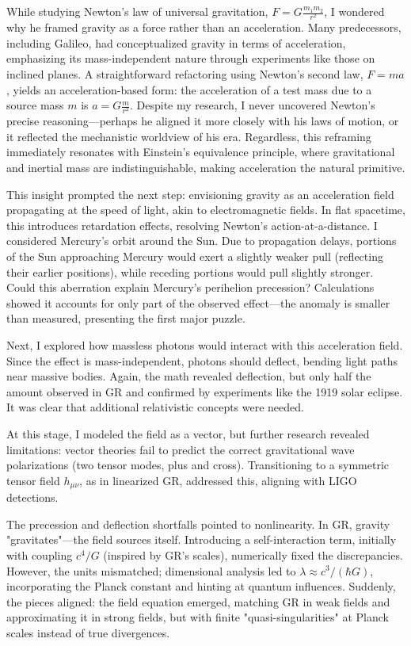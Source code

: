 \documentclass{article}
\begin{document}
While studying Newton's law of universal gravitation, \( F = G \frac{m_1 m_2}{r^2} \), I wondered why he framed gravity as a force rather than an acceleration. Many predecessors, including Galileo, had conceptualized gravity in terms of acceleration, emphasizing its mass-independent nature through experiments like those on inclined planes. A straightforward refactoring using Newton's second law, \( F = m a \), yields an acceleration-based form: the acceleration of a test mass due to a source mass \( m \) is \( a = G \frac{m}{r^2} \). Despite my research, I never uncovered Newton's precise reasoning—perhaps he aligned it more closely with his laws of motion, or it reflected the mechanistic worldview of his era. Regardless, this reframing immediately resonates with Einstein's equivalence principle, where gravitational and inertial mass are indistinguishable, making acceleration the natural primitive.

This insight prompted the next step: envisioning gravity as an acceleration field propagating at the speed of light, akin to electromagnetic fields. In flat spacetime, this introduces retardation effects, resolving Newton's action-at-a-distance. I considered Mercury's orbit around the Sun. Due to propagation delays, portions of the Sun approaching Mercury would exert a slightly weaker pull (reflecting their earlier positions), while receding portions would pull slightly stronger. Could this aberration explain Mercury's perihelion precession? Calculations showed it accounts for only part of the observed effect—the anomaly is smaller than measured, presenting the first major puzzle.

Next, I explored how massless photons would interact with this acceleration field. Since the effect is mass-independent, photons should deflect, bending light paths near massive bodies. Again, the math revealed deflection, but only half the amount observed in GR and confirmed by experiments like the 1919 solar eclipse. It was clear that additional relativistic concepts were needed.

At this stage, I modeled the field as a vector, but further research revealed limitations: vector theories fail to predict the correct gravitational wave polarizations (two tensor modes, plus and cross). Transitioning to a symmetric tensor field \( h_{\mu\nu} \), as in linearized GR, addressed this, aligning with LIGO detections.

The precession and deflection shortfalls pointed to nonlinearity. In GR, gravity "gravitates"—the field sources itself. Introducing a self-interaction term, initially with coupling \( c^4 / G \) (inspired by GR's scales), numerically fixed the discrepancies. However, the units mismatched; dimensional analysis led to \( \lambda \approx c^3 / (\hbar G) \), incorporating the Planck constant and hinting at quantum influences. Suddenly, the pieces aligned: the field equation emerged, matching GR in weak fields and approximating it in strong fields, but with finite "quasi-singularities" at Planck scales instead of true divergences.
\end{document}
